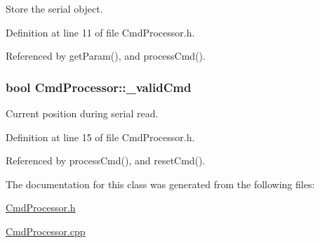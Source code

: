 Store the serial object. 



Definition at line 11 of file CmdProcessor.h.



Referenced by getParam(), and processCmd().

\hypertarget{class_cmd_processor_a18b0886303779762a37096d6446aefa6}{
\subsubsection[{\_\-validCmd}]{\setlength{\rightskip}{0pt plus 5cm}bool {\bf CmdProcessor::\_\-validCmd}}}
\label{class_cmd_processor_a18b0886303779762a37096d6446aefa6}


Current position during serial read. 



Definition at line 15 of file CmdProcessor.h.



Referenced by processCmd(), and resetCmd().



The documentation for this class was generated from the following files:\begin{DoxyCompactItemize}
\item 
\hyperlink{_cmd_processor_8h}{CmdProcessor.h}\item 
\hyperlink{_cmd_processor_8cpp}{CmdProcessor.cpp}\end{DoxyCompactItemize}
